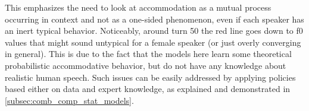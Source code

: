 This emphasizes the need to look at accommodation as a mutual process occurring in context and not as a one-sided phenomenon, even if each speaker has an inert typical behavior.
Noticeably, around turn 50 the red line goes down to \ac{f0} values that might sound untypical for a female speaker (or just overly converging in general).
This is due to the fact that the models here learn some theoretical probabilistic accommodative behavior, but do not have any knowledge about realistic human speech.
Such issues can be easily addressed by applying policies based either on data and expert knowledge, as explained and demonstrated in \cref{subsec:comb_comp_stat_models}.